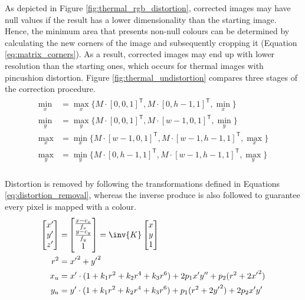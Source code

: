 As depicted in Figure \ref{fig:thermal_rgb_distortion}, corrected images may have null values if the result has a lower dimensionality than the starting image. Hence, the minimum area that presents non-null colours can be determined by calculating the new corners of the image and subsequently cropping it (Equation \ref{eq:matrix_corners}). As a result, corrected images may end up with lower resolution than the starting ones, which occurs for thermal images with pincushion distortion. Figure \ref{fig:thermal_undistortion} compares three stages of the correction procedure. 
\begin{gather}
    \begin{aligned}
    \label{eq:matrix_corners}
    \min_x &= \max_x \{M \cdot [0, 0, 1]^\mathsf{T}, M \cdot [0, h - 1, 1]^\mathsf{T}, \min_x\}\\
    \min_y &= \max_y\{M \cdot [0, 0, 1]^\mathsf{T}, M \cdot [w - 1, 0, 1]^\mathsf{T}, \min_y\}\\
    \max_x &= \min_x\{M \cdot [w - 1, 0, 1]^\mathsf{T}, M \cdot [w - 1, h - 1, 1]^\mathsf{T}, \max_x\}\\
    \max_y &= \min_y\{M \cdot [0, h - 1, 1]^\mathsf{T}, M \cdot [w - 1, h - 1, 1]^\mathsf{T}, \max_y\}\\
    \end{aligned}
\end{gather}

Distortion is removed by following the transformations defined in Equations \ref{eq:distortion_removal}, whereas the inverse produce is also followed to guarantee every pixel is mapped with a colour.
\begin{gather}
    \label{eq:distortion_removal}
    \begin{aligned}
    \begin{bmatrix} 
        x'\\y'\\ z'
    \end{bmatrix}
    =& 
    \begin{bmatrix}
        \frac{x - c_x}{f_x}\\\frac{y - c_y}{f_y}\\ 1
    \end{bmatrix}
    = 
    \inv{K} \begin{bmatrix}
        x\\ y\\ 1
    \end{bmatrix}\\
    r^2 =& \hspace{1mm} {x'}^2 + {y'}^2\\
    x_u =& \hspace{1mm} x' \cdot (1 + k_1r^2 + k_2r^4 + k_3r^6) + 2p_1{x'}{y''} + p_2(r^2 + 2{x'}^2)\\
    y_u =& \hspace{1mm} y' \cdot (1 + k_1r^2 + k_2r^4 + k_3r^6) + p_1(r^2 + 2{y'}^2) +2p_2{x'}{y'}
    \end{aligned}
\end{gather}

